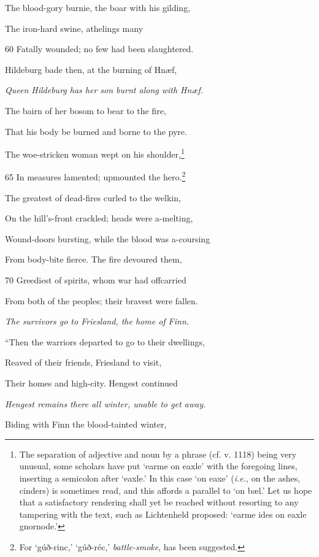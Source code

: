 The blood-gory burnie, the boar with his gilding,

The iron-hard swine, athelings many

60
Fatally wounded; no few had been slaughtered.

Hildeburg bade then, at the burning of Hnæf,

\emph{Queen Hildeburg
has her son burnt
along with Hnæf.}

The bairn of her bosom to bear to the fire,

That his body be burned and borne to the pyre.

The woe-stricken woman wept on his shoulder,\footnote{The separation of adjective and noun by a phrase (cf. v. 1118) being very
unusual, some scholars have put ‘earme on eaxle’ with the foregoing lines,
inserting a semicolon after ‘eaxle.’ In this case ‘on eaxe’ (\emph{i.e.}, on the ashes,
cinders) is sometimes read, and this affords a parallel to ‘on bæl.’ Let us hope
that a satisfactory rendering shall yet be reached without resorting to any tampering
with the text, such as Lichtenheld proposed: ‘earme ides on eaxle gnornode.’}

65
In measures lamented; upmounted the hero.\footnote{For ‘gúð-rinc,’ ‘gúð-réc,’ \emph{battle-smoke}, has been suggested.}

The greatest of dead-fires curled to the welkin,

On the hill’s-front crackled; heads were a-melting,

Wound-doors bursting, while the blood was a-coursing

From body-bite fierce. The fire devoured them,

70
Greediest of spirits, whom war had offcarried

From both of the peoples; their bravest were fallen.



\emph{The survivors go
to Friesland, the
home of Finn.}

“Then the warriors departed to go to their dwellings,

Reaved of their friends, Friesland to visit,

Their homes and high-city. Hengest continued

\emph{Hengest remains
there all winter,
unable to get away.}

Biding with Finn the blood-tainted winter,

